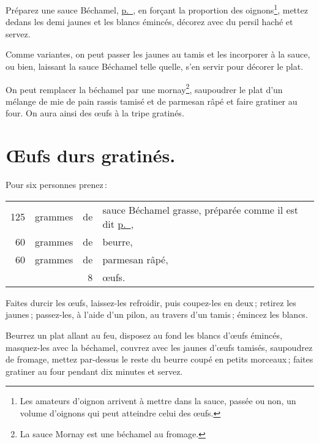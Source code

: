 Préparez une sauce Béchamel, \hyperlink{p0269}{p. \pageref{pg0269}}, en forçant
la proportion des oignons\footnote{Les amateurs d'oignon arrivent à mettre dans
la sauce, passée ou non, un volume d'oignons qui peut atteindre celui des
œufs.}, mettez dedans les demi jaunes et les blancs émincés, décorez avec du
persil haché et servez.

\sk

Comme variantes, on peut passer les jaunes au tamis et les incorporer à la
sauce, ou bien, laissant la sauce Béchamel telle quelle, s'en servir pour
décorer le plat.

On peut remplacer la béchamel par une mornay\footnote{La sauce Mornay est une
béchamel au fromage.}, saupoudrer le plat d'un mélange de mie de pain rassis
tamisé et de parmesan râpé et faire gratiner au four. On aura ainsi des œufs
à la tripe gratinés.

\section*{\centering Œufs durs gratinés.}

Pour six personnes prenez :

\medskip

\footnotesize
\begin{longtable}{rrrp{16em}}
  125 & grammes & de & sauce Béchamel grasse, préparée comme il est dit 
                       \hyperlink{p0566}{p. \pageref{pg0566}},                                            \\
   60 & grammes & de & beurre,                                                                            \\
   60 & grammes & de & parmesan râpé,                                                                     \\
      &         &  8 & œufs.                                                                              \\
\end{longtable}
\normalsize

Faites durcir les œufs, laissez-les refroidir, puis coupez-les en deux ;
retirez les jaunes ; passez-les, à l'aide d’un pilon, au travers d’un tamis ;
émincez les blancs.

Beurrez un plat allant au feu, disposez au fond les blancs d'œufs émincés,
masquez-les avec la béchamel, couvrez avec les jaunes d'œufs tamisés,
saupoudrez de fromage, mettez par-dessus le reste du beurre coupé en petits
morceaux ; faites gratiner au four pendant dix minutes et servez.

